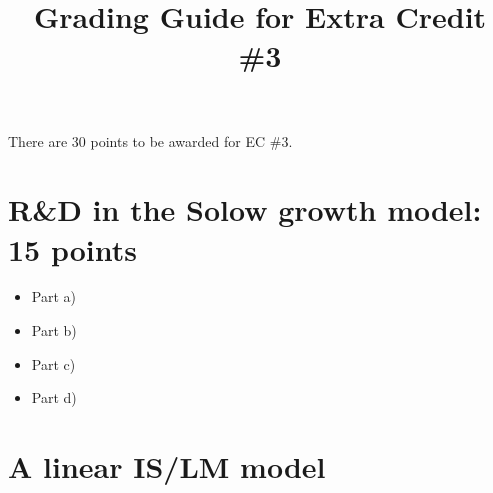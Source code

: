 \documentclass[12pt]{pracjourn_rwr}
\title{Grading Guide for Extra Credit \#3}
\theoremstyle{definition}
\theoremstyle{remark}
\begin{document}
\maketitle


There are 30 points to be awarded for EC \#3.

\section{R\&D in the Solow growth model: 15 points}
\begin{itemize}
\item Part a) 
\item Part b)
\item Part c)
\item Part d)
\end{itemize}

\section{A linear IS/LM model}

% 
% 
\end{document}

